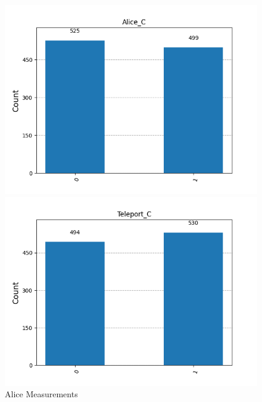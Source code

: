\begin{figure}[h!]
    \centering
    \caption{Alice Measurements}
    \label{am}    
    \begin{minipage}{0.49\textwidth}
        \centering
        \includegraphics[width=\linewidth]{exercise3/94df8a48-88cc-4ec6-8341-d8ae773c7c37__Alice_C__counts.png}
    \end{minipage}
    \hfill
    \begin{minipage}{0.49\textwidth}
        \centering
        \includegraphics[width=\linewidth]{exercise3/94df8a48-88cc-4ec6-8341-d8ae773c7c37__Teleport_C__counts.png}
    \end{minipage}
\end{figure}


